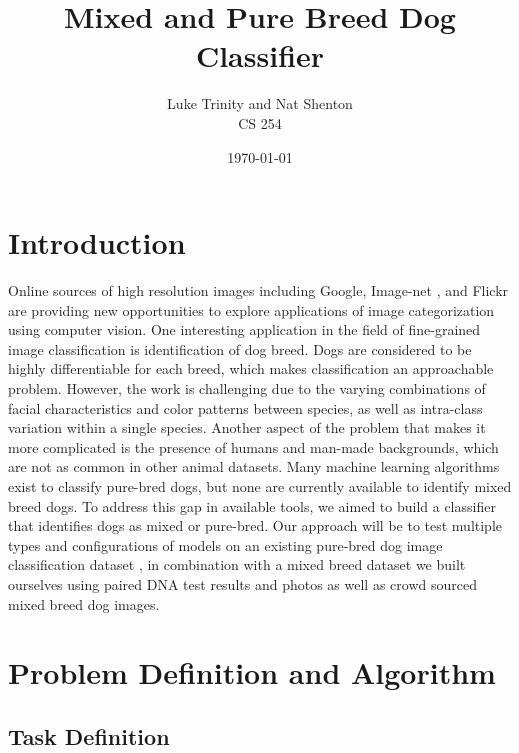 \documentclass[12pt]{article}
\title{Mixed and Pure Breed Dog Classifier}
\date{\today}
\author{Luke Trinity and Nat Shenton \\ CS 254}
\begin{document}
 
\maketitle
\section{Introduction}

Online sources of high resolution images including Google, Image-net \cite{deng2009imagenet}, and Flickr are providing new opportunities to explore applications of image categorization using computer vision. One interesting application in the field of fine-grained image classification is identification of dog breed. Dogs are considered to be highly differentiable for each breed, which makes classification an approachable problem. However, the work is challenging due to the varying combinations of facial characteristics and color patterns between species, as well as intra-class variation within a single species. Another aspect of the problem that makes it more complicated is the presence of humans and man-made backgrounds, which are not as common in other animal datasets. Many machine learning algorithms exist to classify pure-bred dogs, but none are currently available to identify mixed breed dogs. To address this gap in available tools, we aimed to build a classifier that identifies dogs as mixed or pure-bred. Our approach will be to test multiple types and configurations of models on an existing pure-bred dog image classification dataset \cite{khosla2011novel}, in combination with a mixed breed dataset we built ourselves using paired DNA test results and photos \cite{voith2009comparison} as well as crowd sourced mixed breed dog images. 

\section{Problem Definition and Algorithm}

\subsection{Task Definition}
\end{document}
